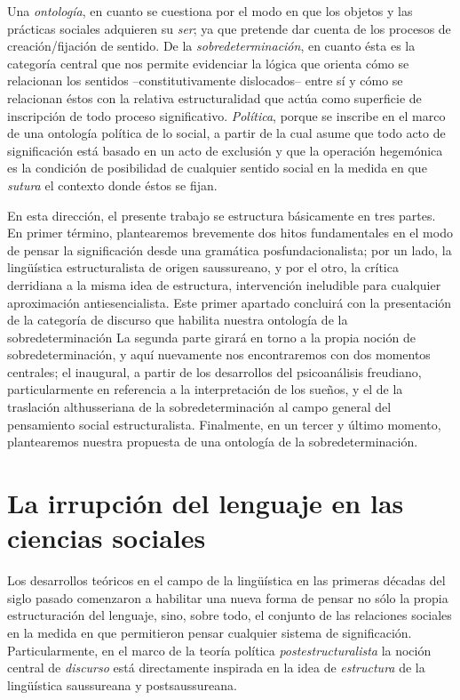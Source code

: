 Una \emph{ontología}, en cuanto se cuestiona por el modo en que los objetos y las prácticas sociales adquieren su \emph{ser}; ya que pretende dar cuenta de los procesos de creación/fijación de sentido. De la \emph{sobredeterminación}, en cuanto ésta es la categoría central que nos permite evidenciar la lógica que orienta cómo se relacionan los sentidos --constitutivamente dislocados-- entre sí y cómo se relacionan éstos con la relativa estructuralidad que actúa como superficie de inscripción de todo proceso significativo. \emph{Política}, porque se inscribe en el marco de una ontología política de lo social, a partir de la cual asume que todo acto de significación está basado en un acto de exclusión y que la operación hegemónica es la condición de posibilidad de cualquier sentido social en la medida en que \emph{sutura} el contexto donde éstos se fijan.

En esta dirección, el presente trabajo se estructura básicamente en tres partes. En primer término, plantearemos brevemente dos hitos fundamentales en el modo de pensar la significación desde una gramática posfundacionalista; por un lado, la lingüística estructuralista de origen saussureano, y por el otro, la crítica derridiana a la misma idea de estructura, intervención ineludible para cualquier aproximación antiesencialista. Este primer apartado concluirá con la presentación de la categoría de discurso que habilita nuestra ontología de la sobredeterminación La segunda parte girará en torno a la propia noción de sobredeterminación, y aquí nuevamente nos encontraremos con dos momentos centrales; el inaugural, a partir de los desarrollos del psicoanálisis freudiano, particularmente en referencia a la interpretación de los sueños, y el de la traslación althusseriana de la sobredeterminación al campo general del pensamiento social estructuralista. Finalmente, en un tercer y último momento, plantearemos nuestra propuesta de una ontología de la sobredeterminación.

\section{La irrupción del lenguaje en las ciencias sociales}

Los desarrollos teóricos en el campo de la lingüística en las primeras décadas del siglo pasado comenzaron a habilitar una nueva forma de pensar no sólo la propia estructuración del lenguaje, sino, sobre todo, el conjunto de las relaciones sociales en la medida en que permitieron pensar cualquier sistema de significación. Particularmente, en el marco de la teoría política \emph{postestructuralista} la noción central de \emph{discurso} está directamente inspirada en la idea de \emph{estructura} de la lingüística saussureana y postsaussureana.


